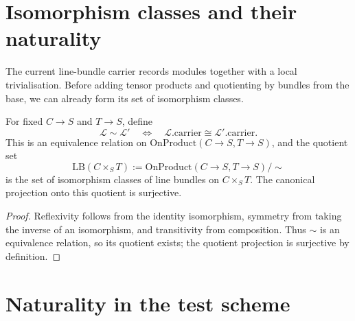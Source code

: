 \section{Isomorphism classes and their naturality}
\label{mk-sec:lbp_relpic_quotient}

The current line-bundle carrier records modules together with a local
trivialisation.  Before adding tensor products and quotienting by bundles from
the base, we can already form its set of isomorphism classes.

\begin{theorem}\label{mk-thm:relative_pic_quotient_well_defined}
  \leanok

  For fixed $C\to S$ and $T\to S$, define
  \[
    \mathcal L\sim\mathcal L'
      \quad\Longleftrightarrow\quad
      \mathcal L.\mathrm{carrier}\cong\mathcal L'.\mathrm{carrier}.
  \]
  This is an equivalence relation on
  $\mathrm{OnProduct}(C\to S,T\to S)$, and the quotient set
  \[
    \mathrm{LB}(C\times_S T):=
    \mathrm{OnProduct}(C\to S,T\to S)/\!\sim
  \]
  is the set of isomorphism classes of line bundles on $C\times_S T$.  The
  canonical projection onto this quotient is surjective.
\end{theorem}
\begin{proof}
  \leanok
  Reflexivity follows from the identity isomorphism, symmetry from taking the
  inverse of an isomorphism, and transitivity from composition.  Thus $\sim$ is
  an equivalence relation, so its quotient exists; the quotient projection is
  surjective by definition.
\end{proof}

\section{Naturality in the test scheme}
\label{mk-sec:lbp_pullback_natural}

